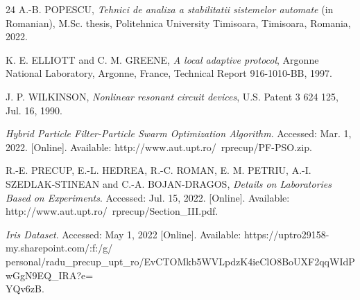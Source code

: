 \documentclass[twoside]{romjist}
\begin{document}
\begin{thebibliography}{24}
	A.-B. \uppercase{Popescu}, \textit{Tehnici de analiza a stabilitatii sistemelor automate} (in Romanian), M.Sc. thesis, Politehnica University Timisoara, Timisoara, Romania, 2022.

	K. E. \uppercase{Elliott} and C. M. \uppercase{Greene}, \textit{A local adaptive protocol}, Argonne National Laboratory, Argonne, France, Technical Report 916-1010-BB, 1997.

	J. P. \uppercase{Wilkinson}, \textit{Nonlinear resonant circuit devices}, U.S. Patent 3 624 125, Jul. 16, 1990.

	\textit{Hybrid Particle Filter-Particle Swarm Optimization Algorithm}. Accessed: Mar. 1, 2022. [Online]. Available: http://www.aut.upt.ro/~rprecup/PF-PSO.zip.

	R.-E. \uppercase{Precup}, E.-L. \uppercase{Hedrea}, R.-C. \uppercase{Roman}, E. M. \uppercase{Petriu}, A.-I. \uppercase{Szedlak-Stinean} and C.-A. \uppercase{Bojan-Dragos}, \textit{Details on Laboratories Based on Experiments}. Accessed: Jul. 15, 2022. [Online]. Available: http://www.aut.upt.ro/~rprecup/Section\_III.pdf.


	\textit{Iris Dataset}. Accessed: May 1, 2022 [Online]. Available: https://uptro29158-my.sharepoint.com/:f:/g/\\
personal/radu\_precup\_upt\_ro/EvCTOMkb5WVLpdzK4ieClO8BoUXF2qqWIdPwGgN9EQ\_IRA?e=\\
YQv6zB.	
\end{thebibliography}
\end{document}
